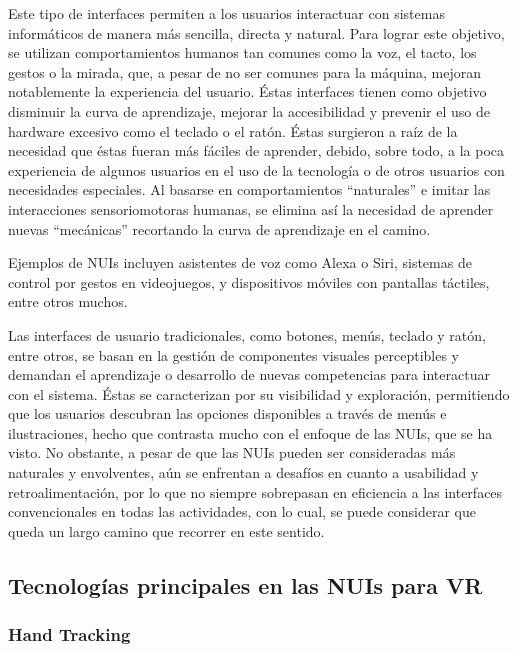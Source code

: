 Este tipo de interfaces permiten a los usuarios interactuar con sistemas informáticos de manera más sencilla, directa y natural.  Para lograr este objetivo, se utilizan comportamientos humanos tan comunes como la voz, el tacto, los gestos o la mirada, que, a pesar de no ser comunes para la máquina, mejoran notablemente la experiencia del usuario. Éstas interfaces tienen como objetivo disminuir la curva de aprendizaje, mejorar la accesibilidad y prevenir el uso de hardware excesivo como el teclado o el ratón. Éstas surgieron a raíz de la necesidad que éstas fueran más fáciles de aprender, debido, sobre todo, a la poca experiencia de algunos usuarios en el uso de la tecnología o de otros usuarios con necesidades especiales. Al basarse en comportamientos ``naturales'' e imitar las interacciones sensoriomotoras humanas, se elimina así la necesidad de aprender  nuevas ``mecánicas'' recortando la curva de aprendizaje en el camino. \cite{Human-Drone} \cite{NaturalUserInterfaces} \cite{TheNaturalUserInterfaces} \cite{GestureUserInterfaces} 

Ejemplos de NUIs incluyen asistentes de voz como Alexa o Siri, sistemas de control por gestos en videojuegos, y dispositivos móviles con pantallas táctiles, entre otros muchos. \cite{AlexaVSCortana}

Las interfaces de usuario tradicionales, como botones, menús, teclado y ratón, entre otros, se basan en la gestión de componentes visuales perceptibles y demandan el aprendizaje o desarrollo de nuevas competencias para interactuar con el sistema. Éstas se caracterizan por su visibilidad y exploración, permitiendo que los usuarios descubran las opciones disponibles a través de menús e ilustraciones, hecho que contrasta mucho con el enfoque de las NUIs, que se ha visto.  No obstante, a pesar de que las NUIs pueden ser consideradas más naturales y envolventes, aún se enfrentan a desafíos en cuanto a usabilidad y retroalimentación, por lo que no siempre sobrepasan en eficiencia a las interfaces convencionales en todas las actividades, con lo cual, se puede considerar que queda un largo camino que recorrer en este sentido. \cite{Human-Drone} \cite{NotNaturalUserInterfaces} \cite{AlexaVSCortana}

\subsection{Tecnologías principales en las NUIs para VR}

\label{Tec_NUIs}

\subsubsection{Hand Tracking}


